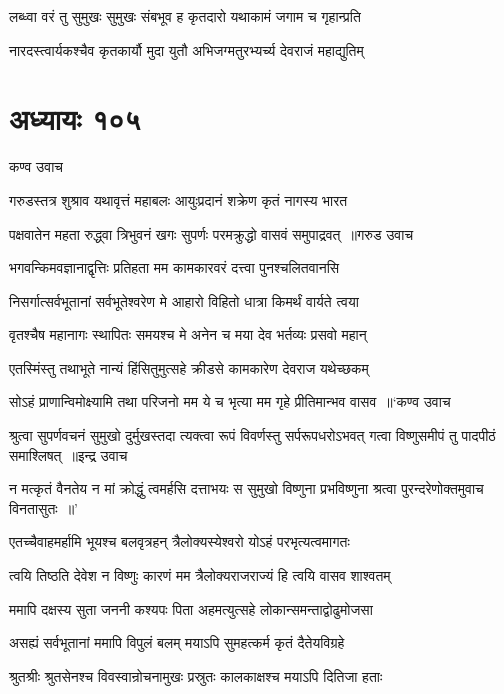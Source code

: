 \twolineshloka
{लब्ध्वा वरं तु सुमुखः सुमुखः संबभूव ह}
{कृतदारो यथाकामं जगाम च गृहान्प्रति}


\twolineshloka
{नारदस्त्वार्यकश्चैव कृतकार्यौ मुदा युतौ}
{अभिजग्मतुरभ्यर्च्य देवराजं महाद्युतिम्}


\chapter{अध्यायः १०५}
\twolineshloka
{कण्व उवाच}
{}


\twolineshloka
{गरुडस्तत्र शुश्राव यथावृत्तं महाबलः}
{आयुःप्रदानं शक्रेण कृतं नागस्य भारत}


\threelineshloka
{पक्षवातेन महता रुद्ध्वा त्रिभुवनं खगः}
{सुपर्णः परमक्रुद्धो वासवं समुपाद्रवत् ॥गरुड उवाच}
{}


\twolineshloka
{भगवन्किमवज्ञानाद्वृत्तिः प्रतिहता मम}
{कामकारवरं दत्त्वा पुनश्चलितवानसि}


\twolineshloka
{निसर्गात्सर्वभूतानां सर्वभूतेश्वरेण मे}
{आहारो विहितो धात्रा किमर्थं वार्यते त्वया}


\twolineshloka
{वृतश्चैष महानागः स्थापितः समयश्च मे}
{अनेन च मया देव भर्तव्यः प्रसवो महान्}


\twolineshloka
{एतस्मिंस्तु तथाभूते नान्यं हिंसितुमुत्सहे}
{क्रीडसे कामकारेण देवराज यथेच्छकम्}


\threelineshloka
{सोऽहं प्राणान्विमोक्ष्यामि तथा परिजनो मम}
{ये च भृत्या मम गृहे प्रीतिमान्भव वासव ॥`कण्व उवाच}
{}


\fourlineindentedshloka
{श्रुत्वा सुपर्णवचनं सुमुखो दुर्मुखस्तदा}
{त्यक्त्वा रूपं विवर्णस्तु सर्परूपधरोऽभवत्}
{गत्वा विष्णुसमीपं तु पादपीठं समाश्लिषत् ॥इन्द्र उवाच}
{}


\threelineshloka
{न मत्कृतं वैनतेय न मां क्रोद्धुं त्वमर्हसि}
{दत्ताभयः स सुमुखो विष्णुना प्रभविष्णुना}
{श्रत्वा पुरन्दरेणोक्तमुवाच विनतासुतः ॥'}


\twolineshloka
{एतच्चैवाहमर्हामि भूयश्च बलवृत्रहन्}
{त्रैलोक्यस्येश्वरो योऽहं परभृत्यत्वमागतः}


\twolineshloka
{त्वयि तिष्ठति देवेश न विष्णुः कारणं मम}
{त्रैलोक्यराजराज्यं हि त्वयि वासव शाश्वतम्}


\twolineshloka
{ममापि दक्षस्य सुता जननी कश्यपः पिता}
{अहमत्युत्सहे लोकान्समन्ताद्वोढुमोजसा}


\twolineshloka
{असह्यं सर्वभूतानां ममापि विपुलं बलम्}
{मयाऽपि सुमहत्कर्म कृतं दैतेयविग्रहे}


\twolineshloka
{श्रुतश्रीः श्रुतसेनश्च विवस्वान्रोचनामुखः}
{प्रस्रुतः कालकाक्षश्च मयाऽपि दितिजा हताः}


